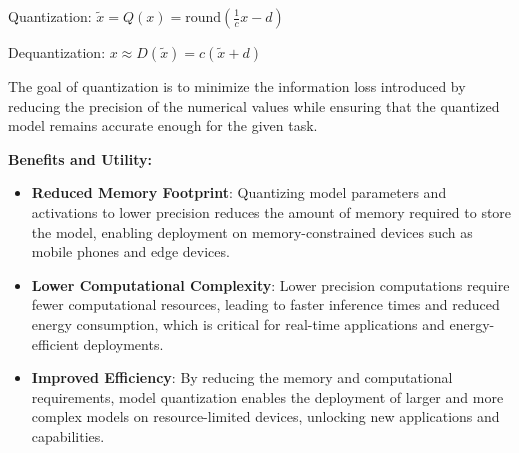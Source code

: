 \documentclass[a4paper]{report}
\begin{document}
{Quantization: $\tilde{x} = Q(x)= \text{round}\left(\frac{1}{c} x - d\right)$ 

Dequantization: $x \approx D(\tilde{x}) = c(\tilde{x}+d)$

The goal of quantization is to minimize the information loss introduced by reducing the precision of the numerical values while ensuring that the quantized model remains accurate enough for the given task.

\textbf{Benefits and Utility:}
\begin{itemize}
    \item \textbf{Reduced Memory Footprint}: Quantizing model parameters and activations to lower precision reduces the amount of memory required to store the model, enabling deployment on memory-constrained devices such as mobile phones and edge devices.
    \item \textbf{Lower Computational Complexity}: Lower precision computations require fewer computational resources, leading to faster inference times and reduced energy consumption, which is critical for real-time applications and energy-efficient deployments.
    \item \textbf{Improved Efficiency}: By reducing the memory and computational requirements, model quantization enables the deployment of larger and more complex models on resource-limited devices, unlocking new applications and capabilities.
\end{itemize}

}
\end{document}
